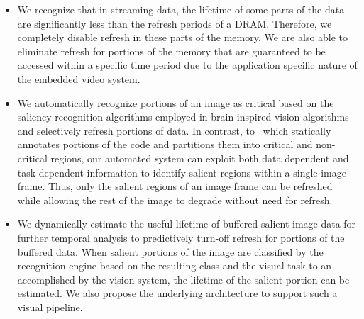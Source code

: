 \begin{itemize}[leftmargin=*]
\item We recognize that in streaming data, the lifetime of some parts of the data are significantly less than the refresh periods of a DRAM. Therefore, we completely disable refresh in these parts of the memory. 
We are also able to eliminate refresh for portions of the memory that are guaranteed to be accessed within a specific time period due to the application specific nature of the embedded video system.
\item We automatically recognize portions of an image as critical based on the saliency-recognition algorithms employed in brain-inspired vision algorithms and selectively refresh portions of data.
In contrast, to~\cite{Liu2011} which statically annotates portions of the code and partitions them into critical and non-critical regions, our automated system can exploit both data dependent and task dependent information to identify salient regions within a single image frame. 
Thus, only the salient regions of an image frame can be refreshed while allowing the rest of the image to degrade without need for refresh. 
\item We dynamically estimate the useful lifetime of buffered salient image data for further temporal analysis to predictively turn-off refresh for portions of the buffered data. When salient portions of the image are classified by the recognition engine based on the resulting class and the visual task to an accomplished by the vision system, the lifetime of the salient portion can be estimated. 
We also propose the underlying architecture to support such a visual pipeline.
\end{itemize}

